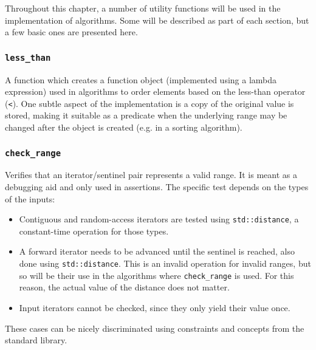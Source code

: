 Throughout this chapter, a number of utility functions will be used in the
implementation of algorithms.  Some will be described as part of each section,
but a few basic ones are presented here.

\subsubsection{\texttt{less\_than}}

A function which creates a function object (implemented using a lambda
expression) used in algorithms to order elements based on the less-than operator
(\texttt{<}).  One subtle aspect of the implementation is a copy of the original
value is stored, making it suitable as a predicate when the underlying range may
be changed after the object is created (e.g. in a sorting algorithm).


\vspace{-\baselineskip}

\subsubsection{\texttt{check\_range}}

Verifies that an iterator/sentinel pair represents a valid range.  It is meant
as a debugging aid and only used in assertions.  The specific test depends on
the types of the inputs:

\begin{itemize}
    \item
        Contiguous and random-access iterators are tested using
        \texttt{std::distance}, a constant-time operation for those types.
    \item
        A forward iterator needs to be advanced until the sentinel is reached,
        also done using \texttt{std::distance}.  This is an invalid operation
        for invalid ranges, but so will be their use in the algorithms where
        \texttt{check\_range} is used.  For this reason, the actual value of the
        distance does not matter.
    \item
        Input iterators cannot be checked, since they only yield their value
        once.
\end{itemize}

These cases can be nicely discriminated using constraints and concepts from the
standard library.


\vspace{-\baselineskip}

